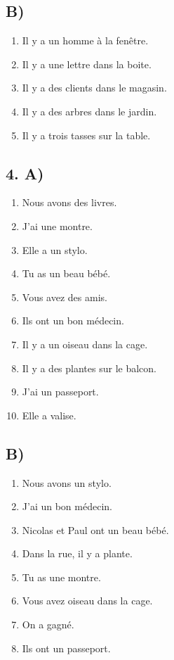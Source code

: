 \subsection*{B)}

\begin{enumerate}
    \item Il y a un homme à la fenêtre.
    \item Il y a une lettre dans la boite.
    \item Il y a des clients dans le magasin.
    \item Il y a des arbres dans le jardin.
    \item Il y a trois tasses sur la table.
\end{enumerate}

\subsection*{4. A)}

\begin{enumerate}
    \item Nous avons des livres.
    \item J'ai une montre.
    \item Elle a un stylo.
    \item Tu as un beau bébé.
    \item Vous avez des amis.
    \item Ils ont un bon médecin.
    \item Il y a un oiseau dans la cage.
    \item Il y a des plantes sur le balcon.
    \item J'ai un passeport.
    \item Elle a valise.
\end{enumerate}

\subsection*{B)}

\begin{enumerate}
    \item Nous avons un stylo.
    \item J'ai un bon médecin.
    \item Nicolas et Paul ont un beau bébé.
    \item Dans la rue, il y a plante.
    \item Tu as une montre.
    \item Vous avez oiseau dans la cage.
    \item On a gagné.
    \item Ils ont un passeport.
\end{enumerate}

